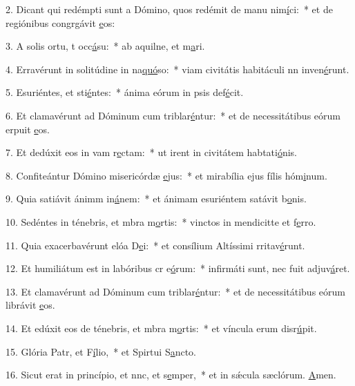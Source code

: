 2. Dicant qui redémpti sunt a Dómino, quos redémit de manu nim\uline{í}ci:~* et de regiónibus congrgávit \uline{e}os:\par 
3. A solis ortu, t occ\uline{á}su:~* ab aquilne, et m\uline{a}ri.\par 
4. Erravérunt in solitúdine in na\uline{quó}so:~* viam civitátis habitáculi nn inven\uline{é}runt.\par 
5. Esuriéntes, et sti\uline{é}ntes:~* ánima eórum in psis def\uline{é}cit.\par 
6. Et clamavérunt ad Dóminum cum triblar\uline{é}ntur:~* et de necessitátibus eórum erpuit \uline{e}os.\par 
7. Et dedúxit eos in vam r\uline{e}ctam:~* ut irent in civitátem habtati\uline{ó}nis.\par 
8. Confiteántur Dómino misericórdæ \uline{e}jus:~* et mirabília ejus fílis hóm\uline{i}num.\par 
9. Quia satiávit ánimm in\uline{á}nem:~* et ánimam esuriéntem satávit b\uline{o}nis.\par 
10. Sedéntes in ténebris, et mbra m\uline{o}rtis:~* vinctos in mendicitte et f\uline{e}rro.\par 
11. Quia exacerbavérunt elóa D\uline{e}i:~* et consílium Altíssimi rritav\uline{é}runt.\par 
12. Et humiliátum est in labóribus cr e\uline{ó}rum:~* infirmáti sunt, nec fuit  adjuv\uline{á}ret.\par 
13. Et clamavérunt ad Dóminum cum triblar\uline{é}ntur:~* et de necessitátibus eórum librávit \uline{e}os.\par 
14. Et edúxit eos de ténebris, et mbra m\uline{o}rtis:~* et víncula erum disr\uline{ú}pit.\par 
15. Glória Patr, et F\uline{í}lio,~* et Spirtui S\uline{a}ncto.\par 
16. Sicut erat in princípio, et nnc, et s\uline{e}mper,~* et in sǽcula sæclórum. \uline{A}men.\par 
